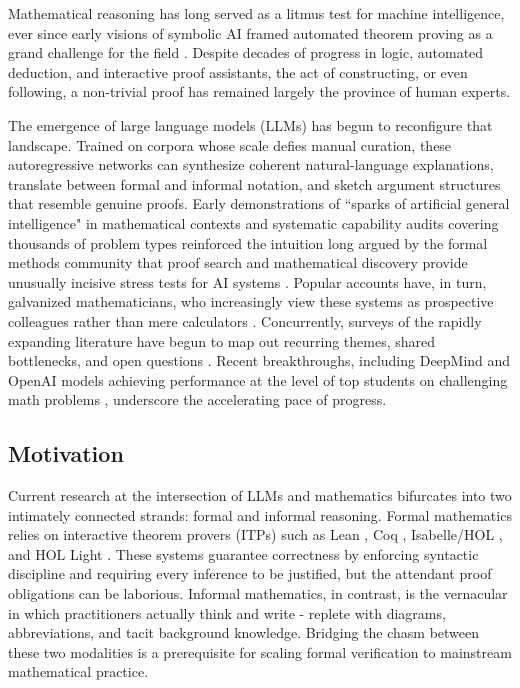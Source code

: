 \documentclass[acmsmall,anonymous]{acmart}
\begin{document}
Mathematical reasoning has long served as a litmus test for machine intelligence, ever since early visions of symbolic AI framed automated theorem proving as a grand challenge for the field \cite{mccarthy1955proposal}. Despite decades of progress in logic, automated deduction, and interactive proof assistants, the act of constructing, or even following, a non-trivial proof has remained largely the province of human experts. 

The emergence of large language models (LLMs) \cite{brown2020language,touvron2023llama,openai2023gpt,chowdhery2022palm,kojima2022large} has begun to reconfigure that landscape. Trained on corpora whose scale defies manual curation, these autoregressive networks can synthesize coherent natural-language explanations, translate between formal and informal notation, and sketch argument structures that resemble genuine proofs.  Early demonstrations of “sparks of artificial general intelligence" in mathematical contexts \cite{bubeck2023sparks} and systematic capability audits covering thousands of problem types \cite{clark2021all,jiang2022thor} reinforced the intuition long argued by the formal methods community that proof search and mathematical discovery provide unusually incisive stress tests for AI systems \cite{szegedy2020promising}.  Popular accounts have, in turn, galvanized mathematicians, who increasingly view these systems as prospective colleagues rather than mere calculators \cite{castelvecchi2021mathematicians,buzzard2019future}.  Concurrently, surveys of the rapidly expanding literature have begun to map out recurring themes, shared bottlenecks, and open questions \cite{lu-2023-survey,meadows-2024-mlp-survey,liu-2025-math-lm-survey,zhao2023survey,asperti2025thinkingmachines,wang2025survey_math_reasoning,weng2025autoformalization_survey,wang2025mllm_math_survey,anonymous2025thinkingmachines,yan2024survey,ahn2024,liu2023b}.  Recent breakthroughs, including DeepMind and OpenAI models achieving performance at the level of top students on challenging math problems \cite{gibney2025deepmindopenai,huang2025geminiimo}, underscore the accelerating pace of progress.

\subsection{Motivation}
Current research at the intersection of LLMs and mathematics bifurcates into two intimately connected strands: formal and informal reasoning.  Formal mathematics relies on interactive theorem provers (ITPs) such as Lean \cite{de2015lean}, Coq \cite{bertot2004coq}, Isabelle/HOL \cite{paulson1990isabelle}, and HOL Light \cite{harrison1996hol}.  These systems guarantee correctness by enforcing syntactic discipline and requiring every inference to be justified, but the attendant proof obligations can be laborious.  Informal mathematics, in contrast, is the vernacular in which practitioners actually think and write - replete with diagrams, abbreviations, and tacit background knowledge.  Bridging the chasm between these two modalities is a prerequisite for scaling formal verification to mainstream mathematical practice.
\end{document}

